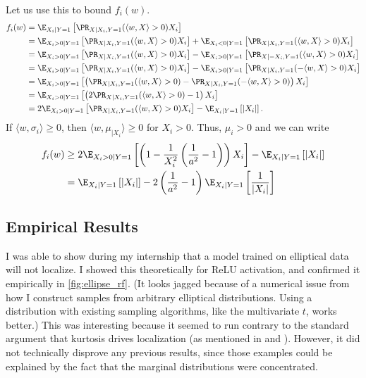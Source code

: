 Let us use this to bound $f_i(w)$.
\begin{align*}
    f_i(w)
    &= \E_{X_i \mid Y=1} \left[ \PR_{X \mid X_i, Y=1}( \langle w, X \rangle > 0 ) X_i \right] \\
    &= \E_{X_i > 0 \mid Y=1} \left[ \PR_{X \mid X_i, Y=1}( \langle w, X \rangle > 0 ) X_i \right] + \E_{X_i < 0 \mid Y=1} \left[ \PR_{X \mid X_i, Y=1}( \langle w, X \rangle > 0 ) X_i \right] \\
    &= \E_{X_i > 0 \mid Y=1} \left[ \PR_{X \mid X_i, Y=1}( \langle w, X \rangle > 0 ) X_i \right] - \E_{X_i > 0 \mid Y=1} \left[ \PR_{X \mid -X_i, Y=1}( \langle w, X \rangle > 0 ) X_i \right] \\
    &= \E_{X_i > 0 \mid Y=1} \left[ \PR_{X \mid X_i, Y=1}( \langle w, X \rangle > 0 ) X_i \right] - \E_{X_i > 0 \mid Y=1} \left[ \PR_{X \mid X_i, Y=1}( -\langle w, X \rangle > 0 ) X_i \right] \\
    &= \E_{X_i > 0 \mid Y=1} \left[ \left( \PR_{X \mid X_i, Y=1}( \langle w, X \rangle > 0 ) - \PR_{X \mid X_i, Y=1}( -\langle w, X \rangle > 0 ) \right) X_i \right] \\
    &= \E_{X_i > 0 \mid Y=1} \left[ \left( 2 \PR_{X \mid X_i, Y=1}( \langle w, X \rangle > 0 ) - 1 \right) X_i \right] \\
    &= 2 \E_{X_i > 0 \mid Y=1} \left[ \PR_{X \mid X_i, Y=1}( \langle w, X \rangle > 0 ) X_i \right] - \E_{X_i \mid Y=1} \left[ |X_i| \right].
\end{align*}
If $\langle w, \sigma_i \rangle \geq 0$, then $\langle w, \mu_{\mid X_i} \rangle \geq 0$ for $X_i > 0$.
Thus, $\mu_i > 0$ and we can write
\begin{align*}
    f_i(w)
    &\geq 2 \E_{X_i > 0 \mid Y=1} \left[ \left( 1 - \frac{1}{X_i^2} \left( \frac{1}{a^2} - 1 \right) \right) X_i \right] - \E_{X_i \mid Y=1} \left[ |X_i| \right] \\
    &= \E_{X_i \mid Y=1} \left[ |X_i| \right] - 2 \left( \frac{1}{a^2} - 1 \right) \E_{X_i \mid Y=1} \left[ \frac{1}{|X_i|} \right] \\
\end{align*}


\subsection{Empirical Results}
I was able to show during my internship that a model trained on elliptical data will not localize.
I showed this theoretically for ReLU activation, and confirmed it empirically in \cref{fig:ellipse_rf}.
(It looks jagged because of a numerical issue from how I construct samples from arbitrary elliptical distributions.
Using a distribution with existing sampling algorithms, like the multivariate $t$, works better.)
This was interesting because it seemed to run contrary to the standard argument that kurtosis drives localization (as mentioned in \cite{brito2016nonlinear} and \cite{ingrosso2022data}).
However, it did not technically disprove any previous results, since those examples could be explained by the fact that the marginal distributions were concentrated.

